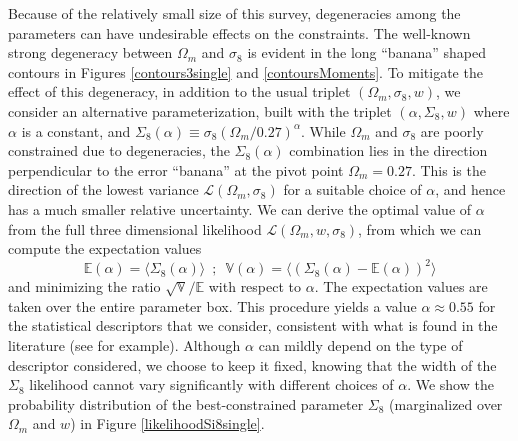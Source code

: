 \documentclass[reprint,aps,prd,superscriptaddress,showkeys,showpacs]{revtex4-1}
\begin{document}
Because of the relatively small size of this survey, degeneracies
among the parameters can have undesirable effects on the constraints.
The well-known strong degeneracy between $\Omega_m$ and $\sigma_8$ is
evident in the long ``banana'' shaped contours in Figures
\ref{contours3single} and \ref{contoursMoments}.  To mitigate the
effect of this degeneracy, in addition to the usual triplet
$(\Omega_m,\sigma_8,w)$, we consider an alternative parameterization,
built with the triplet $(\alpha,\Sigma_8,w)$ where $\alpha$ is a
constant, and
$\Sigma_8(\alpha)\equiv\sigma_8(\Omega_m/0.27)^\alpha$. While
$\Omega_m$ and $\sigma_8$ are poorly constrained due to degeneracies,
the $\Sigma_8(\alpha)$ combination lies in the direction perpendicular
to the error ``banana'' at the pivot point $\Omega_m=0.27$.  
This is the direction of the lowest variance
$\mathcal{L}(\Omega_m,\sigma_8)$ for a suitable choice of $\alpha$,
and hence has a much smaller relative uncertainty. We can derive the
optimal value of $\alpha$ from the full three dimensional likelihood
$\mathcal{L}(\Omega_m,w,\sigma_8)$, from which we can compute the
expectation values
\begin{equation}
\mathds{E}(\alpha) = \langle\Sigma_8(\alpha)\rangle \,\,\, ; \,\,\, \mathds{V}(\alpha) = \langle(\Sigma_8(\alpha)-\mathds{E}(\alpha))^2\rangle
\end{equation}
%
and minimizing the ratio $\sqrt{\mathds{V}}/\mathds{E}$ with respect
to $\alpha$. The expectation values are taken over the entire parameter box. 
This procedure yields a value $\alpha\approx0.55$ for the
statistical descriptors that we consider, 
consistent with what is found in the literature (see \citep{CFHTKilbinger} for example). Although $\alpha$ can mildly depend on the type of descriptor considered, we choose to keep it fixed, knowing that the width of the $\Sigma_8$ likelihood cannot vary significantly with different choices of $\alpha$.  
We show the probability distribution of the best-constrained parameter
$\Sigma_8$ (marginalized over $\Omega_m$ and $w$) in Figure
\ref{likelihoodSi8single}. 
\end{document}
